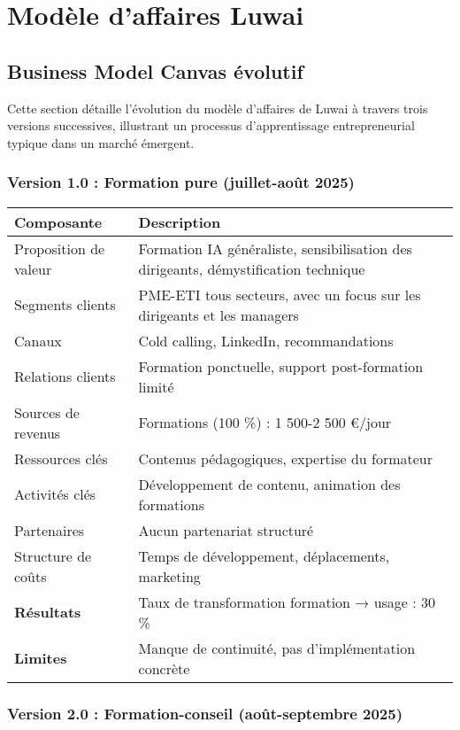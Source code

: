 \chapter{Modèle d’affaires Luwai}
\label{app:luwai}

\section{Business Model Canvas évolutif}

Cette section détaille l’évolution du modèle d’affaires de Luwai à travers trois versions successives, illustrant un processus d’apprentissage entrepreneurial typique dans un marché émergent.

\subsection{Version 1.0 : Formation pure (juillet-août 2025)}

\begin{longtable}{@{}>{\raggedright\arraybackslash}p{4cm}>{\raggedright\arraybackslash}p{10cm}@{}}
\toprule
\textbf{Composante} & \textbf{Description} \\
\midrule
Proposition de valeur & Formation IA généraliste, sensibilisation des dirigeants, démystification technique \\
Segments clients & PME-ETI tous secteurs, avec un focus sur les dirigeants et les managers \\
Canaux & Cold calling, LinkedIn, recommandations \\
Relations clients & Formation ponctuelle, support post-formation limité \\
Sources de revenus & Formations (100 \%) : 1 500-2 500 €/jour \\
Ressources clés & Contenus pédagogiques, expertise du formateur \\
Activités clés & Développement de contenu, animation des formations \\
Partenaires & Aucun partenariat structuré \\
Structure de coûts & Temps de développement, déplacements, marketing \\
\midrule
\textbf{Résultats} & Taux de transformation formation → usage : 30 \% \\
\textbf{Limites} & Manque de continuité, pas d’implémentation concrète \\
\bottomrule
\end{longtable}

\subsection{Version 2.0 : Formation-conseil (août-septembre 2025)}


